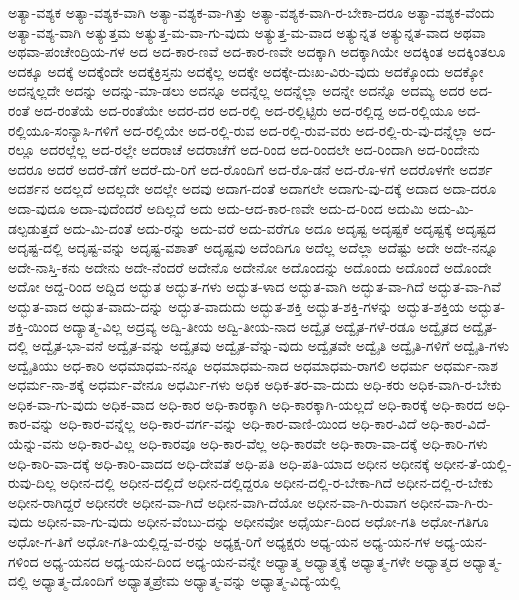 {ಅತ್ಯಾ-ವಶ್ಯಕ
ಅತ್ಯಾ-ವಶ್ಯಕ-ವಾಗಿ
ಅತ್ಯಾ-ವಶ್ಯಕ-ವಾ-ಗಿತ್ತು
ಅತ್ಯಾ-ವಶ್ಯಕ-ವಾಗಿ-ರ-ಬೇಕಾ-ದರೂ
ಅತ್ಯಾ-ವಶ್ಯಕ-ವೆಂದು
ಅತ್ಯಾ-ವಶ್ಯ-ವಾಗಿ
ಅತ್ಯುತ್ತಮ
ಅತ್ಯುತ್ತ-ಮ-ವಾ-ಗು-ವುದು
ಅತ್ಯುತ್ತ-ಮ-ವಾದ
ಅತ್ಯುನ್ನತ
ಅತ್ಯುನ್ನತ-ವಾದ
ಅಥವಾ
ಅಥವಾ-ಪಂಚೇಂದ್ರಿಯ-ಗಳ
ಅದ
ಅದ-ಕಾರ-ಣವೆ
ಅದ-ಕಾರ-ಣವೇ
ಅದಕ್ಕಾಗಿ
ಅದಕ್ಕಾಗಿಯೇ
ಅದಕ್ಕಿಂತ
ಅದಕ್ಕಿಂತಲೂ
ಅದಕ್ಕೂ
ಅದಕ್ಕೆ
ಅದಕ್ಕೆಂದೇ
ಅದಕ್ಕೆಕ್ರಿಸ್ತನು
ಅದಕ್ಕೆಲ್ಲ
ಅದಕ್ಕೇ
ಅದಕ್ಕೇ-ದುಃಖ-ವಿರು-ವುದು
ಅದಕ್ಕೊಂದು
ಅದಕ್ಕೋ
ಅದನ್ನಲ್ಲದೇ
ಅದನ್ನು
ಅದನ್ನು-ಮಾ-ಡಲು
ಅದನ್ನೂ
ಅದನ್ನೆಲ್ಲ
ಅದನ್ನೆಲ್ಲಾ
ಅದನ್ನೇ
ಅದನ್ನೊ
ಅದಮ್ಯ
ಅದರ
ಅದ-ರಂತೆ
ಅದ-ರಂತೆಯೆ
ಅದ-ರಂತೆಯೇ
ಅದರ-ದರ
ಅದ-ರಲ್ಲಿ
ಅದ-ರಲ್ಲಿಟ್ಟಿರು
ಅದ-ರಲ್ಲಿದ್ದ
ಅದ-ರಲ್ಲಿಯೂ
ಅದ-ರಲ್ಲಿಯೂ-ಸಂನ್ಯಾಸಿ-ಗಳಿಗೆ
ಅದ-ರಲ್ಲಿಯೇ
ಅದ-ರಲ್ಲಿ-ರುವ
ಅದ-ರಲ್ಲಿ-ರುವ-ವರು
ಅದ-ರಲ್ಲಿ-ರು-ವು-ದನ್ನೆಲ್ಲಾ
ಅದ-ರಲ್ಲೂ
ಅದರಲ್ಲೆಲ್ಲ
ಅದ-ರಲ್ಲೇ
ಅದರಾಚೆ
ಅದರಾಚೆಗೆ
ಅದ-ರಿಂದ
ಅದ-ರಿಂದಲೇ
ಅದ-ರಿಂದಾಗಿ
ಅದ-ರಿಂದೇನು
ಅದರೂ
ಅದರೆ
ಅದರೆ-ಡೆಗೆ
ಅದರೆ-ದು-ರಿಗೆ
ಅದ-ರೊಂದಿಗೆ
ಅದ-ರೊ-ಡನೆ
ಅದ-ರೊ-ಳಗೆ
ಅದರೊಳಗೇ
ಅದರ್ಶ
ಅದರ್ಶನ
ಅದಲ್ಲದೆ
ಅದಲ್ಲದೇ
ಅದಲ್ಲೇ
ಅದವು
ಅದಾಗ-ದಂತೆ
ಅದಾಗಲೇ
ಅದಾಗು-ವು-ದಕ್ಕೆ
ಅದಾದ
ಅದಾ-ದರೂ
ಅದಾ-ವುದೂ
ಅದಾ-ವುದೆಂದರೆ
ಅದಿಲ್ಲದೆ
ಅದು
ಅದು-ಆದ-ಕಾರ-ಣವೇ
ಅದು-ದ-ರಿಂದ
ಅದುಮಿ
ಅದು-ಮಿ-ಡಲ್ಪಡುತ್ತದೆ
ಅದು-ಮಿ-ದಂತೆ
ಅದು-ರನ್ನು
ಅದು-ವರೆ
ಅದು-ವರೆಗೂ
ಅದೂ
ಅದೃಷ್ಟ
ಅದೃಷ್ಟಕೆ
ಅದೃಷ್ಟಕ್ಕೆ
ಅದೃಷ್ಟದ
ಅದೃಷ್ಟ-ದಲ್ಲಿ
ಅದೃಷ್ಟ-ವನ್ನು
ಅದೃಷ್ಟ-ವಶಾತ್
ಅದೃಷ್ಟವು
ಅದೆಂದಿಗೂ
ಅದೆಲ್ಲ
ಅದೆಲ್ಲಾ
ಅದೆಷ್ಟು
ಅದೇ
ಅದೇ-ನನ್ನೂ
ಅದೇ-ನಾಸ್ತಿ-ಕನು
ಅದೇನು
ಅದೇ-ನೆಂದರೆ
ಅದೇನೊ
ಅದೇನೋ
ಅದೊಂದನ್ನು
ಅದೊಂದು
ಅದೊಂದೆ
ಅದೊಂದೇ
ಅದೋ
ಅದ್ದ-ರಿಂದ
ಅದ್ದಿದ
ಅದ್ಭುತ
ಅದ್ಭುತ-ಗಳು
ಅದ್ಭುತ-ಳಾದ
ಅದ್ಭುತ-ವಾಗಿ
ಅದ್ಭುತ-ವಾ-ಗಿದೆ
ಅದ್ಭುತ-ವಾ-ಗಿವೆ
ಅದ್ಭುತ-ವಾದ
ಅದ್ಭುತ-ವಾದು-ದನ್ನು
ಅದ್ಭುತ-ವಾದುದು
ಅದ್ಭುತ-ಶಕ್ತಿ
ಅದ್ಭುತ-ಶಕ್ತಿ-ಗಳನ್ನು
ಅದ್ಭುತ-ಶಕ್ತಿಯ
ಅದ್ಭುತ-ಶಕ್ತಿ-ಯಿಂದ
ಅದ್ಯಾತ್ಮ-ವಿಲ್ಲ
ಅದ್ರವ್ಯ
ಅದ್ವಿ-ತೀಯ
ಅದ್ವಿ-ತೀಯ-ನಾದ
ಅದ್ವೈತ
ಅದ್ವೈತ-ಗಳೆ-ರಡೂ
ಅದ್ವೈತದ
ಅದ್ವೈತ-ದಲ್ಲಿ
ಅದ್ವೈತ-ಭಾ-ವನೆ
ಅದ್ವೈತ-ವನ್ನು
ಅದ್ವೈತವು
ಅದ್ವೈತ-ವೆನ್ನು-ವುದು
ಅದ್ವೈತವೇ
ಅದ್ವೈತಿ
ಅದ್ವೈತಿ-ಗಳಿಗೆ
ಅದ್ವೈತಿ-ಗಳು
ಅದ್ವೈತಿಯು
ಅಧ-ಕಾರಿ
ಅಧಮಾಧಮ-ನನ್ನೂ
ಅಧಮಾಧಮ-ನಾದ
ಅಧಮಾಧಮ-ರಾಗಲಿ
ಅಧರ್ಮ
ಅಧರ್ಮ-ನಾಶ
ಅಧರ್ಮ-ನಾ-ಶಕ್ಕೆ
ಅಧರ್ಮ-ವೇನೂ
ಅಧರ್ಮಿ-ಗಳು
ಅಧಿಕ
ಅಧಿಕ-ತರ-ವಾ-ದುದು
ಅಧಿ-ಕರು
ಅಧಿಕ-ವಾಗಿ-ರ-ಬೇಕು
ಅಧಿಕ-ವಾ-ಗು-ವುದು
ಅಧಿಕ-ವಾದ
ಅಧಿ-ಕಾರ
ಅಧಿ-ಕಾರಕ್ಕಾಗಿ
ಅಧಿ-ಕಾರಕ್ಕಾಗಿ-ಯಲ್ಲದೆ
ಅಧಿ-ಕಾರಕ್ಕೆ
ಅಧಿ-ಕಾರದ
ಅಧಿ-ಕಾರ-ವನ್ನು
ಅಧಿ-ಕಾರ-ವನ್ನೆಲ್ಲ
ಅಧಿ-ಕಾರ-ವರ್ಗ-ವನ್ನು
ಅಧಿ-ಕಾರ-ವಾಣಿ-ಯಿಂದ
ಅಧಿ-ಕಾರ-ವಿದೆ
ಅಧಿ-ಕಾರ-ವಿದೆ-ಯೆನ್ನು-ವನು
ಅಧಿ-ಕಾರ-ವಿಲ್ಲ
ಅಧಿ-ಕಾರವೂ
ಅಧಿ-ಕಾರ-ವೆಲ್ಲ
ಅಧಿ-ಕಾರವೇ
ಅಧಿ-ಕಾರಾ-ವಾ-ದಕ್ಕೆ
ಅಧಿ-ಕಾರಿ-ಗಳು
ಅಧಿ-ಕಾರಿ-ವಾ-ದಕ್ಕೆ
ಅಧಿ-ಕಾರಿ-ವಾದದ
ಅಧಿ-ದೇವತೆ
ಅಧಿ-ಪತಿ
ಅಧಿ-ಪತಿ-ಯಾದ
ಅಧೀನ
ಅಧೀನಕ್ಕೆ
ಅಧೀನ-ತೆ-ಯಲ್ಲಿ-ರುವು-ದಿಲ್ಲ
ಅಧೀನ-ದಲ್ಲಿ
ಅಧೀನ-ದಲ್ಲಿದೆ
ಅಧೀನ-ದಲ್ಲಿದ್ದರೂ
ಅಧೀನ-ದಲ್ಲಿ-ರ-ಬೇಕಾ-ಗಿದೆ
ಅಧೀನ-ದಲ್ಲಿ-ರ-ಬೇಕು
ಅಧೀನ-ರಾಗಿದ್ದರೆ
ಅಧೀನರೇ
ಅಧೀನ-ವಾ-ಗಿದೆ
ಅಧೀನ-ವಾಗಿ-ದೆಯೋ
ಅಧೀನ-ವಾ-ಗಿ-ರುವಾಗ
ಅಧೀನ-ವಾ-ಗಿ-ರು-ವುದು
ಅಧೀನ-ವಾ-ಗು-ವುದು
ಅಧೀನ-ವೆಂಬು-ದನ್ನು
ಅಧೀನವೋ
ಅಧೈರ್ಯ-ದಿಂದ
ಅಧೋ-ಗತಿ
ಅಧೋ-ಗತಿಗೂ
ಅಧೋ-ಗ-ತಿಗೆ
ಅಧೋ-ಗತಿ-ಯಲ್ಲಿದ್ದ-ವ-ರನ್ನು
ಅಧ್ಯಕ್ಷ-ರಿಗೆ
ಅಧ್ಯಕ್ಷರು
ಅಧ್ಯ-ಯನ
ಅಧ್ಯ-ಯನ-ಗಳ
ಅಧ್ಯ-ಯನ-ಗಳಿಂದ
ಅಧ್ಯ-ಯನದ
ಅಧ್ಯ-ಯನ-ದಿಂದ
ಅಧ್ಯ-ಯನ-ವನ್ನೇ
ಅಧ್ಯಾತ್ಮ
ಅಧ್ಯಾತ್ಮಕ್ಕೆ
ಅಧ್ಯಾತ್ಮ-ಗಳೇ
ಅಧ್ಯಾತ್ಮದ
ಅಧ್ಯಾತ್ಮ-ದಲ್ಲಿ
ಅಧ್ಯಾತ್ಮ-ದೊಂದಿಗೆ
ಅಧ್ಯಾತ್ಮಪ್ರೇಮ
ಅಧ್ಯಾತ್ಮ-ವನ್ನು
ಅಧ್ಯಾತ್ಮ-ವಿದ್ಯೆ-ಯಲ್ಲಿ
}
